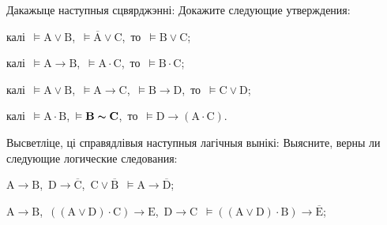 \begin{problemList}
{\begin{belarusianEnumerate}
\end{belarusianEnumerate}
}

\smallskip

\problemItemWithCommonPart
{Дакажыце наступныя сцвярджэнні:}
{Докажите следующие утверждения:}
{%
\begin{belarusianEnumerate}

\item калі\, $\vDash \boldsymbol{\mathrm{A}} \vee \boldsymbol{\mathrm{B}}$,\,
$\vDash \overline{\boldsymbol{\mathrm{A}}} \vee \boldsymbol{\mathrm{C}}$,\,
то\, $\vDash \boldsymbol{\mathrm{B}} \vee \boldsymbol{\mathrm{C}}$;

\item калі\, $\vDash \boldsymbol{\mathrm{A}} \to \boldsymbol{\mathrm{B}}$,\,
$\vDash \boldsymbol{\mathrm{A}} \cdot \boldsymbol{\mathrm{C}}$,\, то\,
$\vDash \boldsymbol{\mathrm{B}} \cdot \boldsymbol{\mathrm{C}}$;

\item калі\, $\vDash \boldsymbol{\mathrm{A}} \vee \boldsymbol{\mathrm{B}}$,\,
$\vDash \boldsymbol{\mathrm{A}} \to \boldsymbol{\mathrm{C}}$,\,
$\vDash \boldsymbol{\mathrm{B}} \to \boldsymbol{\mathrm{D}}$,\, то\,
$\vDash \boldsymbol{\mathrm{C}} \vee \boldsymbol{\mathrm{D}}$;

\item калі\, $\vDash \boldsymbol{\mathrm{A}} \cdot \boldsymbol{\mathrm{B}}$,\,
$\vDash \boldsymbol{\mathrm{B}} \thicksim \boldsymbol{\mathrm{C}}$,\, то\,
$\vDash \boldsymbol{\mathrm{D}} \to (\boldsymbol{\mathrm{A}} \cdot \boldsymbol{\mathrm{C}})$.

\end{belarusianEnumerate}
}

\smallskip

\problemItemWithCommonPart
{Высветліце, ці справядлівыя наступныя лагічныя вынікі:}
{Выясните, верны ли следующие логические следования:}
{%
\begin{belarusianEnumerate}

\item $\boldsymbol{\mathrm{A}} \to \boldsymbol{\mathrm{B}}$,\,
$\boldsymbol{\mathrm{D}} \to \overline{\boldsymbol{\mathrm{C}}}$,\,
$\boldsymbol{\mathrm{C}} \vee \overline{\boldsymbol{\mathrm{B}}}$\,
$\vDash \boldsymbol{\mathrm{A}} \to \overline{\boldsymbol{\mathrm{D}}}$;

\item $\boldsymbol{\mathrm{A}} \to \boldsymbol{\mathrm{B}}$,\, $((\boldsymbol{\mathrm{A}}
\vee \boldsymbol{\mathrm{D}}) \cdot \boldsymbol{\mathrm{C}}) \to \boldsymbol{\mathrm{E}}$,\,
$\boldsymbol{\mathrm{D}} \to \boldsymbol{\mathrm{C}}$\, $\vDash ((\boldsymbol{\mathrm{A}} \vee \boldsymbol{\mathrm{D}}) \cdot \boldsymbol{\mathrm{B}}) \to \overline{\boldsymbol{\mathrm{E}}}$;


\end{belarusianEnumerate}}
\end{problemList}
